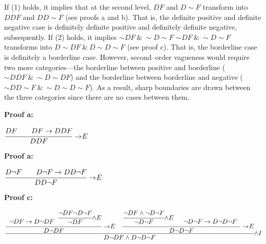 If (1) holds, it implies that at the second level, $DF$ and
$D{\sim}F$ transform into $DDF$ and $DD{\sim}F$ (see proofs a and
b). That is, the definite positive and definite negative case is
definitely definite positive and definitely definite negative,
subsequently. If (2) holds, it implies ${\sim}DF\ \&\  {\sim}D {\sim}F$
${\sim}DF \ \& \ {\sim}D{\sim}F$ transforms into $D{\sim}DF \ \& \ D{\sim}D{\sim}F$ (see proof c). That is,
the borderline case is definitely a borderline case. However,
second--order vagueness would require two more categories---the
borderline between positive and borderline
(${\sim}DDF \ \& \ {\sim}D{\sim}DF$) and the borderline between borderline
and negative (${\sim}DD{\sim}F \ \& \ {\sim}D{\sim}D{\sim}F$). As a result,
sharp boundaries are drawn between the three categories since there are
no cases between them.


\bigskip
\noindent
\begin{minipage}[t]{0.48\textwidth}
    \noindent \textbf{Proof a:} \\
    \begin{center}
    $\cfrac{
        DF \hspace{2em} DF \rightarrow DDF
    }{DDF} {\ \rightarrow \hspace{-0.25em} E}$
    \end{center}
\end{minipage}
\begin{minipage}[t]{0.48\textwidth}
  \noindent \textbf{Proof a:} \\
    \begin{center}
    $\cfrac{
        D \neg F \hspace{2em} D\neg F \rightarrow DD \neg F
    }{DD\neg F} {\ \rightarrow \hspace{-0.25em} E}$
    \end{center}
  \end{minipage}
\bigskip

\noindent \textbf{Proof c:}
  \begin{center}
    $\cfrac{
        \cfrac{
        \begin{array}{c}
        \\
        \neg DF \rightarrow D \neg DF
        \end{array}
        \cfrac{
            \neg DF \neg D \neg F
        }{\neg DF} {\land E}
        }{D \neg DF} {\ \rightarrow \hspace{-0.25em}E} \hspace{1em}
        \cfrac{
            \cfrac{\neg DF \land \neg D \neg F}{\neg D \neg F} {\land E} \hspace{1em}
            \begin{array}{c}
            \\
            \neg D \neg F \rightarrow D \neg D \neg F
            \end{array}
        }{D \neg D \neg F}{\ \rightarrow \hspace{-0.25em}E}
    }{D\neg D F \land D\neg D\neg F} {\land I}$
    \end{center}

